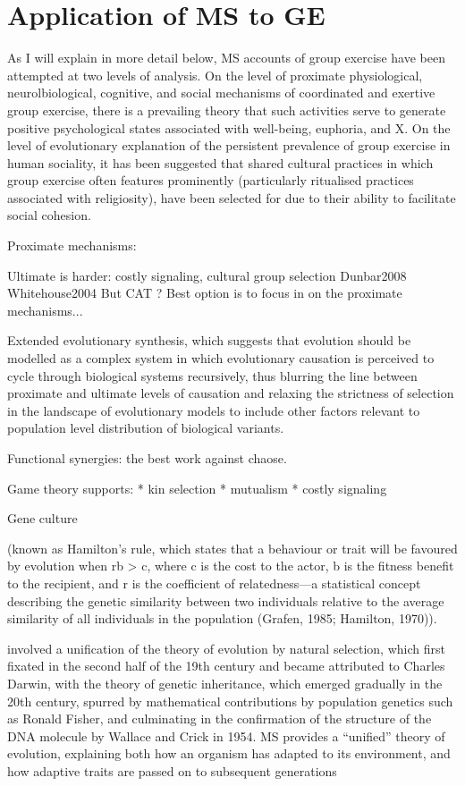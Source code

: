 \section{Application of MS to GE}
As I will explain in more detail below, MS accounts of group exercise have been attempted at two levels of analysis.  On the level of proximate physiological, neurolbiological, cognitive, and social mechanisms of coordinated and exertive group exercise, there is a prevailing theory that such activities serve to generate positive psychological states associated with well-being, euphoria, and X. On the level of evolutionary explanation of the persistent prevalence of group exercise in human sociality, it has been suggested that shared cultural practices in which group exercise often features prominently (particularly ritualised practices associated with religiosity), have been selected for  due to their ability to facilitate social cohesion.

Proximate mechanisms:

Ultimate is harder:
costly signaling,
cultural group selection
    Dunbar2008
    Whitehouse2004
But CAT ?
Best option is to focus in on the proximate mechanisms...

Extended evolutionary synthesis,
which suggests that evolution should be modelled as a complex system in which evolutionary causation is perceived to cycle through biological systems recursively, thus blurring the line between proximate and ultimate levels of causation and relaxing the strictness of selection in the landscape of evolutionary models to include other factors relevant to population level distribution of biological variants.

Functional synergies: the best work against chaose.

Game theory supports:
* kin selection
* mutualism
* costly signaling


Gene culture

(known as Hamilton’s rule, which states that a behaviour or trait will be favoured by evolution when rb > c, where c is the cost to the actor, b is the fitness benefit to the recipient, and r is the coefficient of relatedness—a statistical concept describing the genetic similarity between two individuals relative to the average similarity of all individuals in the population (Grafen, 1985; Hamilton, 1970)).

involved a unification of the theory of evolution by natural selection, which first fixated in the second half of the 19th century and became attributed to Charles Darwin, with the theory of genetic inheritance, which emerged gradually in the 20th century, spurred by mathematical contributions by population genetics such as Ronald Fisher, and culminating in the confirmation of the structure of the DNA molecule by Wallace and Crick in 1954.  MS provides a ``unified'' theory of evolution, explaining both how an organism has adapted to its environment, and how adaptive traits are passed on to subsequent generations




